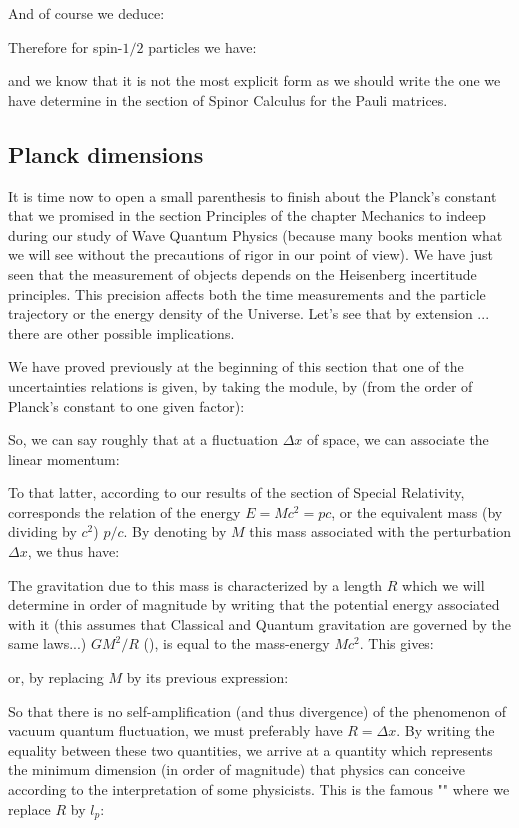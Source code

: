 	And of course we deduce:
	
	Therefore for spin-$1/2$ particles we have:
	
	and we know that it is not the most explicit form as we should write the one we have determine in the section of Spinor Calculus for the Pauli matrices.
	
	\pagebreak
	\subsection{Planck dimensions}
	It is time now to open a small parenthesis to finish about the Planck's constant that we promised in the section Principles of the chapter Mechanics to indeep during our study of Wave Quantum Physics (because many books mention what we will see without the precautions of rigor in our point of view). We have just seen that the measurement of objects depends on the Heisenberg incertitude principles. This precision affects both the time measurements and the particle trajectory or the energy density of the Universe. Let's see that by extension ... there are other possible implications.

	We have proved previously at the beginning of this section that one of the uncertainties relations is given, by taking the module, by (from the order of Planck's constant to one given factor):
	
	So, we can say roughly that at a fluctuation $\Delta x$ of space, we can associate the linear momentum:
	
	To that latter, according to our results of the section of Special Relativity, corresponds the relation of the energy $E=Mc^2=pc$, or the equivalent mass (by dividing by $c^2$) $p/c$. By denoting by $M$ this mass associated with the perturbation $\Delta x$, we thus have:
	
	The gravitation due to this mass is characterized by a length $R$ which we will determine in order of magnitude by writing that the potential energy associated with it (this assumes that Classical and Quantum gravitation are governed by the same laws...) $GM^2/R$ (), is equal to the mass-energy $Mc^2$. This gives:
	
	or, by replacing $M$ by its previous expression:
	
	So that there is no self-amplification (and thus divergence) of the phenomenon of vacuum quantum fluctuation, we must preferably have $R=\Delta x$. By writing the equality between these two quantities, we arrive at a quantity which represents the minimum dimension (in order of magnitude) that physics can conceive according to the interpretation of some physicists. This is the famous "" where we replace $R$ by $l_p$:
	
